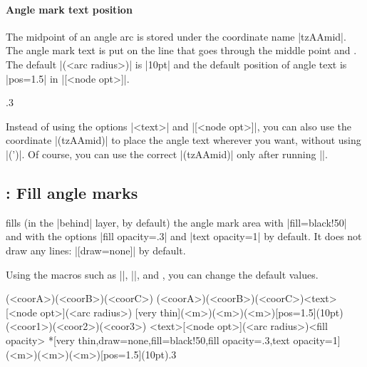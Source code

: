 \paragraph{Angle mark text position}
The midpoint of an angle arc is stored under the coordinate name |tzAAmid|.
The angle mark text is put on the line that goes through the middle point and . The default |(<arc radius>)| is |10pt| and the default position of angle text is |pos=1.5| in |[<node opt>]|.

\begin{tzcode}{.3}
\end{tzcode}

\remark Instead of using the options |{<text>}| and |[<node opt>]|, you can also use the coordinate |(tzAAmid)| to place the angle text wherever you want, without using |\tzanglemark(')|. Of course, you can use the correct |(tzAAmid)| only after running |\tzanglemark|.



\subsection{\protect{}: Fill angle marks}
\label{ss:tzanglemark*}

\icmd{\tzanglemark*} fills (in the |behind| layer, by default) the angle mark area with |fill=black!50| and with the options |fill opacity=.3| and |text opacity=1| by default. It does not draw any lines: |[draw=none]| by default.

Using the macros such as |\settzfillcolor|, |\settzfillopacity|, and \icmd{\settzanglelayer}, you can change the default values.



\begin{tzdef}{}
\tzanglemark*(<coorA>)(<coorB>)(<coorC>)
\tzanglemark[<opt>](<coorA>)(<coorB>)(<coorC>){<text>}[<node opt>](<arc radius>)
  [very thin](<m>)(<m>)(<m>){}[pos=1.5](10pt)
\tzanglemark*[<opt>](<coor1>)(<coor2>)(<coor3>)
             {<text>}[<node opt>](<arc radius>){<fill opacity>}
  *[very thin,draw=none,fill=black!50,fill opacity=.3,text opacity=1]
   (<m>)(<m>)(<m>){}[pos=1.5](10pt){.3}
\end{tzdef}


